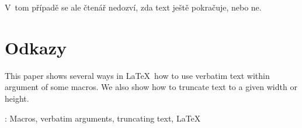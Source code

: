 \documentclass[oldcsbabel]{csbulletin}
\begin{document}
\smallskip\noindent
V~tom případě se ale čtenář nedozví, zda text ještě pokračuje, nebo ne.

\nocite{*}
\begingroup
\section*{Odkazy}
\sloppy
\AtNextBibliography{\small}
\printbibliography[heading=none]
\endgroup

\begin{summary}
This paper shows several ways in \LaTeX\ how to use verbatim text within argument of some macros. We also show how to truncate text to a given width or height.

\keywords: Macros, verbatim arguments, truncating text, \LaTeX
\end{summary}
\end{document}
